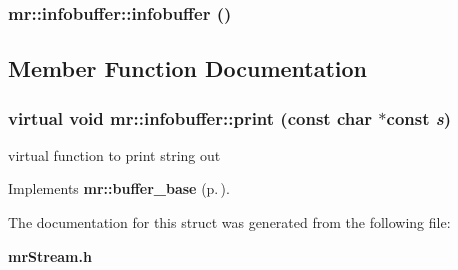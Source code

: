 \subsubsection{\setlength{\rightskip}{0pt plus 5cm}mr::infobuffer::infobuffer ()\hspace{0.3cm}{\tt  [inline]}}\label{structmr_1_1infobuffer_a0}




\subsection{Member Function Documentation}
\subsubsection{\setlength{\rightskip}{0pt plus 5cm}virtual void mr::infobuffer::print (const char $\ast$const {\em s})\hspace{0.3cm}{\tt  [inline, virtual]}}\label{structmr_1_1infobuffer_a1}


virtual function to print string out 



Implements {\bf mr::buffer\_\-base} {\rm (p.\,\pageref{structmr_1_1buffer__base_a3})}.

The documentation for this struct was generated from the following file:\begin{CompactItemize}
\item 
{\bf mr\-Stream.h}\end{CompactItemize}
